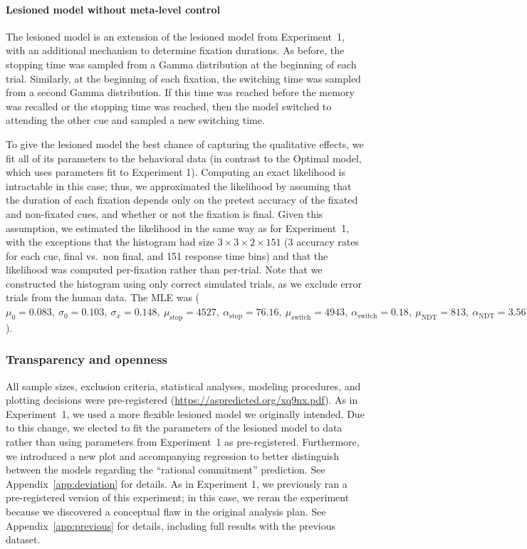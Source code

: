 \paragraph{Lesioned model without meta-level control}

The lesioned model is an extension of the lesioned model from Experiment~1, with an additional mechanism to determine fixation durations. As before, the stopping time was sampled from a Gamma distribution at the beginning of each trial. Similarly, at the beginning of each fixation, the switching time was sampled from a second Gamma distribution. If this time was reached before the memory was recalled or the stopping time was reached, then the model switched to attending the other cue and sampled a new switching time.

To give the lesioned model the best chance of capturing the qualitative effects, we fit all of its parameters to the behavioral data (in contrast to the Optimal model, which uses parameters fit to Experiment 1). Computing an exact likelihood is intractable in this case; thus, we approximated the likelihood by assuming that the duration of each fixation depends only on the pretest accuracy of the fixated and non-fixated cues, and whether or not the fixation is final. Given this assumption, we estimated the likelihood in the same way as for Experiment~1, with the exceptions that the histogram had size $3 \times 3 \times 2 \times 151$ (3 accuracy rates for each cue, final vs.~non final, and 151 response time bins) and that the likelihood was computed per-fixation rather than per-trial. Note that we constructed the histogram using only correct simulated trials, as we exclude error trials from the human data. The MLE was (\(
    \mu_0 = 0.083,\ 
    \sigma_0 = 0.103,\ 
    \sigma_x = 0.148,\ 
    \mu_\text{stop} = 4527,\ 
    \alpha_\text{stop} = 76.16,\ 
    \mu_\text{switch} = 4943,\ 
    \alpha_\text{switch} = 0.18,\ 
    \mu_\text{NDT} = 813,\ 
    \alpha_\text{NDT} = 3.56,\ 
\)).

\subsubsection{Transparency and openness}
All sample sizes, exclusion criteria, statistical analyses, modeling procedures, and plotting decisions were pre-registered (\url{https://aspredicted.org/xq9nx.pdf}). As in Experiment~1, we used a more flexible lesioned model we originally intended. Due to this change, we elected to fit the parameters of the lesioned model to data rather than using parameters from Experiment~1 as pre-registered. Furthermore, we introduced a new plot and accompanying regression to better distinguish between the models regarding the ``rational commitment'' prediction. See Appendix~\ref{app:deviation} for details. As in Experiment 1, we previously ran a pre-registered version of this experiment; in this case, we reran the experiment because we discovered a conceptual flaw in the original analysis plan. See Appendix~\ref{app:previous} for details, including full results with the previous dataset.

